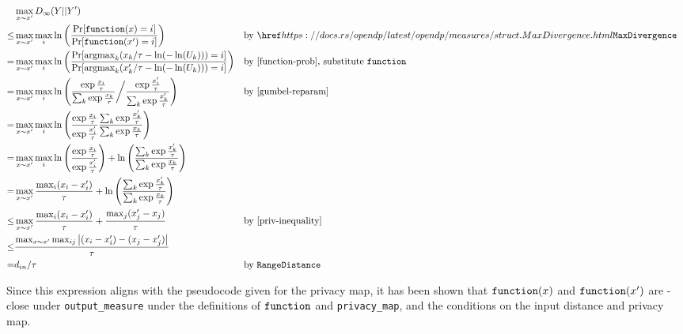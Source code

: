 \documentclass{article}
\begin{document}
\begin{align*}
    &\max_{x \sim x'} D_\infty(Y || Y') \\
    \leq& \max_{x \sim x'} \max_i \ln\left(\frac{\Pr[\function(x) = i]}{\Pr[\function(x') = i]}\right) 
    &&\text{by } \rustdoc{measures/struct}{MaxDivergence}\\
    =& \max_{x \sim x'} \max_i \ln\left(\frac
            {\Pr[\mathrm{argmax}_k (x_k / \tau - \ln(-\ln(U_k))) = i]}
            {\Pr[\mathrm{argmax}_k (x'_k / \tau - \ln(-\ln(U_k))) = i]}
        \right) &&\text{by \ref{function-prob}, substitute \function}\\
    =& \max_{x \sim x'} \max_i \ln \left(
        \frac
            {\exp \frac{x_i}{\tau}}
            {\sum_{k} \exp\frac{x_k}{\tau}
        }
        \bigg/ \frac
            {\exp\frac{x'_i}{\tau}}
            {\sum_{k} \exp\frac{x'_k}{\tau}} \right)
        &&\text{by \ref{gumbel-reparam}} \\
    =& \max_{x \sim x'} \max_i \ln \left(\frac
        {\exp\frac{x_i}{\tau}}{\exp\frac{x'_i}{\tau}}
        \frac{\sum_{k} \exp\frac{x'_k}{\tau}}{\sum_{k} \exp\frac{x_k}{\tau}}\right) \\
    =& \max_{x \sim x'} \max_i \ln \left(\frac
        {\exp\frac{x_i}{\tau}}{\exp\frac{x'_i}{\tau}}\right) + \ln \left(
        \frac{\sum_{k} \exp\frac{x'_k}{\tau}}{\sum_{k} \exp\frac{x_k}{\tau}}\right) \\
    =& \max_{x \sim x'} \frac{\max_i (x_i - x'_i)}{\tau} 
        + \ln\left(\frac{\sum_{k} \exp\frac{x'_k}{\tau}}{\sum_{k} \exp\frac{x_k}{\tau}}\right) \\
    \leq& \max_{x \sim x'} \frac{\max_i (x_i - x'_i)}{\tau} + \frac{\max_j (x'_j - x_j)}{\tau} &&\text{by \ref{priv-inequality}} \\
    \leq& \frac{\max_{x \sim x'} \max_{ij} \abs{(x_i - x'_i) - (x_j - x'_j)}}{\tau} \\
    =& d_{in} / \tau &&\text{by }\texttt{RangeDistance}\\
\end{align*}

Since this expression aligns with the pseudocode given for the privacy map,
it has been shown that $\texttt{function}(x)$ and $\texttt{function}(x')$ are \dout-close under \texttt{output\_measure} 
under the definitions of $\texttt{function}$ and \texttt{privacy\_map}, 
and the conditions on the input distance and privacy map.





\end{document}
